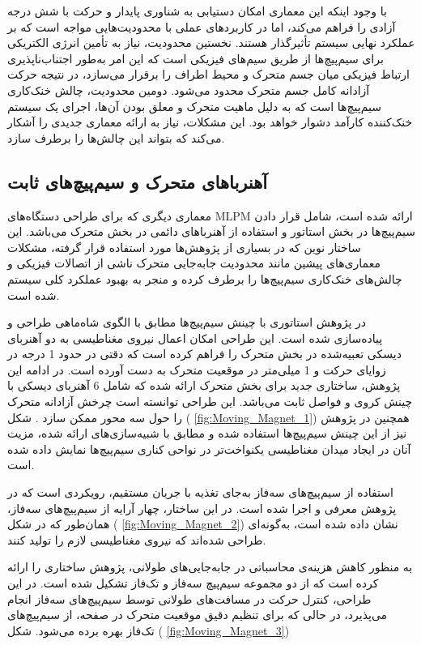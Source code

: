 با وجود اینکه این معماری امکان دستیابی به شناوری پایدار و حرکت با شش درجه آزادی را فراهم می‌کند، اما در کاربردهای عملی با محدودیت‌هایی مواجه است که بر عملکرد نهایی سیستم تأثیرگذار هستند. نخستین محدودیت، نیاز به تأمین انرژی الکتریکی برای سیم‌پیچ‌ها از طریق سیم‌های فیزیکی است که این امر به‌طور اجتناب‌ناپذیری ارتباط فیزیکی میان جسم متحرک و محیط اطراف را برقرار می‌سازد، در نتیجه حرکت آزادانه کامل جسم متحرک محدود می‌شود. دومین محدودیت، چالش خنک‌کاری سیم‌پیچ‌ها است که به دلیل ماهیت متحرک و معلق بودن آن‌ها، اجرای یک سیستم خنک‌کننده کارآمد دشوار خواهد بود. این مشکلات، نیاز به ارائه معماری جدیدی را آشکار می‌کند که بتواند این چالش‌ها را برطرف سازد.

\subsection{‌آهنرباهای متحرک و سیم‌پیچ‌های ثابت}

معماری دیگری که برای طراحی دستگاه‌های MLPM ارائه شده است، شامل قرار دادن سیم‌پیچ‌ها در بخش استاتور و استفاده از آهنرباهای دائمی در بخش متحرک می‌باشد. این ساختار نوین که در بسیاری از پژوهش‌ها مورد استفاده قرار گرفته، مشکلات معماری‌های پیشین مانند محدودیت جابه‌جایی متحرک ناشی از اتصالات فیزیکی و چالش‌های خنک‌کاری سیم‌پیچ‌ها را برطرف کرده و منجر به بهبود عملکرد کلی سیستم شده است.

در پژوهش 
\cite{RN7}
 استاتوری با چینش سیم‌پیچ‌ها مطابق با الگوی شاه‌ماهی
 طراحی و پیاده‌سازی شده است. این طراحی امکان اعمال نیروی مغناطیسی به دو آهنربای دیسکی تعبیه‌شده در بخش متحرک را فراهم کرده است که دقتی در حدود 1 درجه در زوایای حرکت و 1 میلی‌متر در موقعیت متحرک به دست آورده است. در ادامه این پژوهش، ساختاری جدید برای بخش متحرک ارائه شده که شامل 6 آهنربای دیسکی با چینش کروی و فواصل ثابت می‌باشد. این طراحی توانسته است چرخش آزادانه متحرک را حول سه محور ممکن سازد 
\cite{RN39}.
شکل (
\ref{fig:Moving_Magnet_1})
همچنین در پژوهش 
\cite{RN62}
 نیز از این چینش سیم‌پیچ‌ها استفاده شده و مطابق با شبیه‌سازی‌های ارائه شده، مزیت آنان در ایجاد میدان مغناطیسی یکنواخت‌تر در نواحی کناری سیم‌پیچ‌ها نمایش داده شده است.

استفاده از سیم‌پیچ‌های سه‌فاز به‌جای تغذیه با جریان مستقیم، رویکردی است که در پژوهش 
\cite{RN24}
معرفی و اجرا شده است. در این ساختار، چهار آرایه از سیم‌پیچ‌های سه‌فاز، همان‌طور که در 
شکل (
\ref{fig:Moving_Magnet_2})
 نشان داده شده است، به‌گونه‌ای طراحی شده‌اند که نیروی مغناطیسی لازم را تولید کنند.

به ‌منظور کاهش هزینه‌ی محاسباتی در جابه‌جایی‌های طولانی، پژوهش 
\cite{RN32}
 ساختاری را ارائه کرده است که از دو مجموعه سیم‌پیچ‌ سه‌فاز و تک‌فاز تشکیل شده است. در این طراحی، کنترل حرکت در مسافت‌های طولانی توسط سیم‌پیچ‌های سه‌فاز انجام می‌پذیرد، در حالی که برای تنظیم دقیق موقعیت متحرک در صفحه، از سیم‌پیچ‌های تک‌فاز بهره برده می‌شود.
شکل (
\ref{fig:Moving_Magnet_3})

